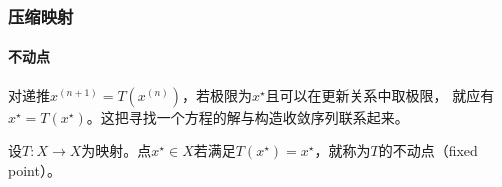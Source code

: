 \subsubsection{压缩映射}
\label{sec:analysis-complete-contraction}

\paragraph{不动点}

对递推$x^{(n+1)}=T(x^{(n)})$，若极限为$x^\star$且可以在更新关系中取极限，
就应有$x^\star=T(x^\star)$。这把寻找一个方程的解与构造收敛序列联系起来。
\begin{definition}[不动点]
\label{def:analysis-fixed-point}
设$T:X\to X$为映射。点$x^\star\in X$若满足$T(x^\star)=x^\star$，就称为$T$的不动点（fixed point）。
\end{definition}

